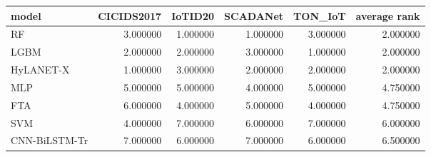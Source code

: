 \begin{tabular}{lrrrrr}
\toprule
model & CICIDS2017 & IoTID20 & SCADANet & TON\_IoT & average rank \\
\midrule
RF & 3.000000 & 1.000000 & 1.000000 & 3.000000 & 2.000000 \\
LGBM & 2.000000 & 2.000000 & 3.000000 & 1.000000 & 2.000000 \\
HyLANET-X & 1.000000 & 3.000000 & 2.000000 & 2.000000 & 2.000000 \\
MLP & 5.000000 & 5.000000 & 4.000000 & 5.000000 & 4.750000 \\
FTA & 6.000000 & 4.000000 & 5.000000 & 4.000000 & 4.750000 \\
SVM & 4.000000 & 7.000000 & 6.000000 & 7.000000 & 6.000000 \\
CNN-BiLSTM-Tr & 7.000000 & 6.000000 & 7.000000 & 6.000000 & 6.500000 \\
\bottomrule
\end{tabular}
